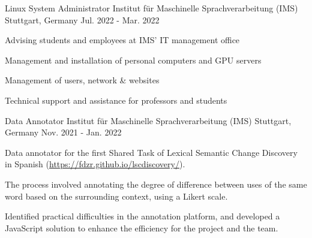\begin{cventries}
  \cventry
    {Linux System Administrator} %
    {Institut für Maschinelle Sprachverarbeitung (IMS)} %
    {Stuttgart, Germany} %
    {Jul. 2022 - Mar. 2022} %
    {
      \begin{cvitems} %
        \item Advising students and employees at IMS' IT management office
        \item Management and installation of personal computers and GPU servers
        \item Management of users, network \& websites
        \item Technical support and assistance for professors and students
      \end{cvitems}
    }

  \cventry
    {Data Annotator} %
    {Institut für Maschinelle Sprachverarbeitung (IMS)} %
    {Stuttgart, Germany} %
    {Nov. 2021 - Jan. 2022} %
    {
      \begin{cvitems} %
        \item Data annotator for the first Shared Task of Lexical Semantic Change Discovery in Spanish (\url{https://fdzr.github.io/lscdiscovery/}). 
        \item The process involved annotating the degree of difference between uses of the same word based on the surrounding context, using a Likert scale.
		\item Identified practical difficulties in the annotation platform, and developed a JavaScript solution to enhance the efficiency for the project and the team.
      \end{cvitems}
    }


\end{cventries}
